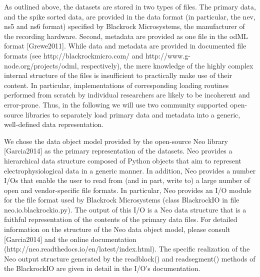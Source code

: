 {As outlined above, the datasets are stored in two types of files. The primary data, and the spike sorted data, are provided in the data format (in particular, the nev, ns5 and ns6 format) specified by Blackrock Microsystems, the manufacturer of the recording hardware. Second, metadata are provided as one file in the odML format [Grewe2011]. While data and metadata are provided in documented file formats (see http://blackrockmicro.com/ and http://www.g-node.org/projects/odml, respectively), the mere knowledge of the highly complex internal structure of the files is insufficient to practically make use of their content. In particular, implementations of corresponding loading routines performed from scratch by individual researchers are likely to be incoherent and error-prone. Thus, in the following we will use two community supported open-source libraries to separately load primary data and metadata into a generic, well-defined data representation. 

We chose the data object model provided by the open-source Neo library [Garcia2014] as the primary representation of the datasets. Neo provides a hierarchical data structure composed of Python objects that aim to represent electrophysiological data in a generic manner. In addition, Neo provides a number I/Os that enable the user to read from (and in part, write to) a large number of open and vendor-specific file formats. In particular, Neo provides an I/O module for the file format used by Blackrock Microsystems (class BlackrockIO in file neo.io.blackrockio.py). The output of this I/O is a Neo data structure that is a faithful representation of the contents of the primary data files. For detailed information on the structure of the Neo data object model, please consult [Garcia2014] and the online documentation (http://neo.readthedocs.io/en/latest/index.html). The specific realization of the Neo output structure generated by the readblock() and readsegment() methods of the BlackrockIO are given in detail in the I/O's documentation. 

}
